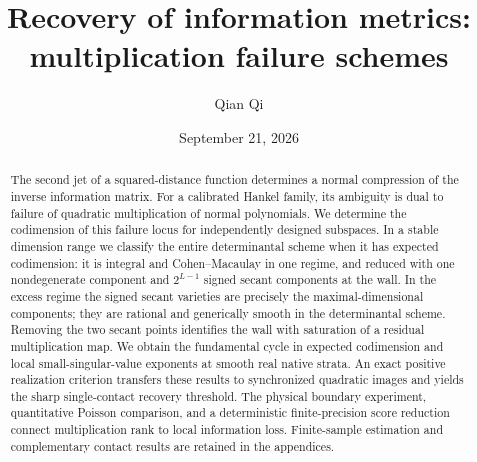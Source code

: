 \documentclass[11pt,reqno]{amsart}
\title[Multiplication failure schemes]{Recovery of information metrics:\\multiplication failure schemes}
\author{Qian Qi}
\date{September 21, 2026}
\numberwithin{equation}{section}
\theoremstyle{definition}\newtheorem{definition}[theorem]{Definition}
\theoremstyle{remark}\newtheorem{remark}[theorem]{Remark}
\begin{document}
\begin{abstract}
The second jet of a squared-distance function determines a normal compression of the inverse information matrix. For a calibrated Hankel family, its ambiguity is dual to failure of quadratic multiplication of normal polynomials. We determine the codimension of this failure locus for independently designed subspaces. In a stable dimension range we classify the entire determinantal scheme when it has expected codimension: it is integral and Cohen--Macaulay in one regime, and reduced with one nondegenerate component and $2^{L-1}$ signed secant components at the wall. In the excess regime the signed secant varieties are precisely the maximal-dimensional components; they are rational and generically smooth in the determinantal scheme. Removing the two secant points identifies the wall with saturation of a residual multiplication map. We obtain the fundamental cycle in expected codimension and local small-singular-value exponents at smooth real native strata. An exact positive realization criterion transfers these results to synchronized quadratic images and yields the sharp single-contact recovery threshold. The physical boundary experiment, quantitative Poisson comparison, and a deterministic finite-precision score reduction connect multiplication rank to local information loss. Finite-sample estimation and complementary contact results are retained in the appendices.
\end{abstract}
\maketitle





\appendix


\end{document}
